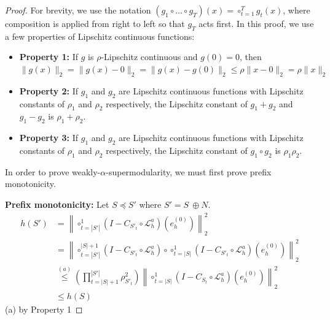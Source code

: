 \documentclass{article}
\begin{document}
\begin{proof}
For brevity, we use the notation $\left(g_1 \circ \dots \circ g_T\right)(x) = \circ_{t = 1}^{T} g_t(x)$, where composition is applied from right to left so that $g_T$ acts first. In this proof, we use a few properties of Lipschitz continuous functions:
\begin{itemize}
    \item \textbf{Property 1:} If $g$ is $\rho$-Lipschitz continuous and $g(0) = 0$, then $\|g(x)\|_2 = \|g(x) - 0\|_2 = \|g(x) - g(0)\|_2 \leq \rho \|x - 0\|_2 = \rho\|x\|_2$
    \item \textbf{Property 2:} If $g_1$ and $g_2$ are Lipschitz continuous functions with Lipschitz constants of $\rho_1$ and $\rho_2$ respectively, the Lipschitz constant of $g_1 + g_2$ and $g_1 - g_2$ is $\rho_1 + \rho_2$.
    \item \textbf{Property 3:} If $g_1$ and $g_2$ are Lipschitz continuous functions with Lipschitz constants of $\rho_1$ and $\rho_2$ respectively, the Lipschitz constant of $g_1 \circ g_2$ is $\rho_1\rho_2$.
\end{itemize}

In order to prove weakly-$\alpha$-supermodularity, we must first prove prefix monotonicity.

\textbf{Prefix monotonicity: } Let $S \preceq S'$ where $S' = S \ \oplus N$.
\begin{align*}
    h(S') &= \left \|\circ_{t = |S'|}^1\left(I - C_{S'_t} \circ \mathcal{L}_h^a\right) \left(e^{(0)}_h\right)\right\|^2_2 \\
    &= \left \|\circ_{t = |S'|}^{|S| + 1}\left(I - C_{S'_t}  \circ \mathcal{L}_h^a\right)\circ \circ_{t = |S|}^1\left(I - C_{S'_t}  \circ \mathcal{L}_h^a\right) \left(e^{(0)}_h\right)\right\|^2_2 \\
    &\overset{(a)}{\leq}\left( \prod_{t = |S| + 1 }^{|S'|} \rho_{S'_t}^2 \right)\left\|\circ_{t = |S|}^1\left(I - C_{S_t} \circ \mathcal{L}_h^a\right) \left(e^{(0)}_h\right)\right\|^2_2 \\
    &\leq h(S)
\end{align*}
(a) by Property 1



\end{proof}
\end{document}

